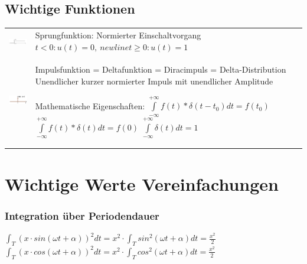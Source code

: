 \documentclass[margin=normal]{tex/hsrzf}
\begin{document}
\subsection{Wichtige Funktionen}
\begin{tabular}{p{5cm} p{10cm}}
  \includegraphics[width = 2.5cm]{img/Sprungfunktion.png} & 
  Sprungfunktion: \newline
  Normierter Einschaltvorgang \newline 
  $ t<0 : u(t) = 0, \ newline
  t \geqslant 0: u(t) = 1 $ \\

  \includegraphics[width = 2.5cm]{img/Impulsfunktion.png} &
  Impulsfunktion = Deltafunktion = \newline 
  Diracimpuls = Delta-Distribution \newline
  Unendlicher kurzer normierter Impuls mit unendlicher Amplitude

  Mathematische Eigenschaften:
$\int\limits _{-\infty} ^{+\infty} f(t) * \delta (t-t_0) dt = f(t_0)$ \newline
$\int\limits _{-\infty} ^{+\infty} f(t) * \delta (t) dt = f(0)$\newline
$\int\limits _{-\infty} ^{+\infty} \delta (t) dt = 1$ \\

\end{tabular}




\section*{Wichtige Werte Vereinfachungen}
\subsubsection*{Integration über Periodendauer}
$\int_T (x \cdot sin(\omega t + \alpha))^2 dt = x^2 \cdot \int_T sin^2(\omega t +\alpha) dt = \frac{x^2}{2}$
$\int_T (x \cdot cos(\omega t+\alpha))^2 dt = x^2 \cdot \int_T cos^2(\omega t+\alpha) dt = \frac{x^2}{2}$
\end{document}
